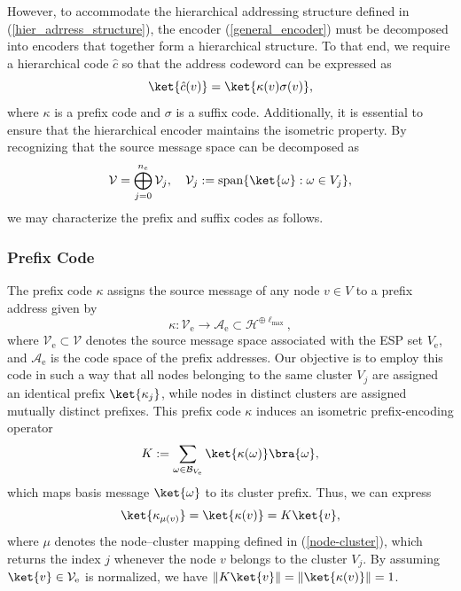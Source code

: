 \documentclass[conference]{IEEEtran}
\begin{document}
However, to accommodate the hierarchical addressing structure defined in (\ref{hier_adrress_structure}), the encoder (\ref{general_encoder}) must be decomposed into encoders that together form a hierarchical structure. To that end, we require a hierarchical code $\hat{c}$ so that the address codeword can be expressed as
\begin{equation}
    \ket{\hat{c}(v)} = \ket{\kappa(v) \sigma(v)},
\end{equation}
where $\kappa$ is a prefix code and $\sigma$ is a suffix code. Additionally, it is essential to ensure that the hierarchical encoder maintains the isometric property.
By recognizing that the source message space can be decomposed as 
\begin{equation}
    \mathcal{V} = \bigoplus_{j=0}^{n_e} \mathcal{V}_j, \quad \mathcal{V}_j := \mathrm{span}\{\ket{\omega} : \omega \in V_{j}\}, \label{SourceSpace_decomposition}
\end{equation}
we may characterize the prefix and suffix codes as follows.

\subsubsection{Prefix Code }
The prefix code $\kappa$ assigns the source message of any node $v\in V$ to a prefix address given by
\begin{equation}
    \kappa: \mathcal{V}_\mathrm{e} \longrightarrow \mathcal{A}_\mathrm{e} \subset \mathcal{H}^{\oplus \ell_\mathrm{max}},
\end{equation}
where $\mathcal{V}_\mathrm{e}\subset\mathcal{V}$ denotes the source message space associated with the ESP set $V_\mathrm{e}$, and $\mathcal{A}_\mathrm{e}$ is the code space of the prefix addresses. 
Our objective is to employ this code in such a way that all nodes belonging to the same cluster $V_j$ are assigned an identical prefix $\ket{\kappa_j}$, while nodes in distinct clusters are assigned mutually distinct prefixes. 
This prefix code $\kappa$ induces an isometric prefix-encoding operator
\begin{equation}
    {K}:= \sum_{\omega \in \mathcal{B}_{V_\mathrm{e}}} \ket{\kappa(\omega)}\bra{\omega}, \label{Prefix_Encoder_Operator}
\end{equation}
which maps basis message $\ket{\omega}$ to its cluster prefix. Thus, we can express
\begin{equation}
\ket{\kappa_{\mu(v)}}=\ket{\kappa(v)}={K}\ket{v},
\end{equation}
where $\mu$ denotes the node–cluster mapping defined in (\ref{node-cluster}), which returns the index $j$ whenever the node $v$ belongs to the cluster $V_j$. By assuming $\ket{v}\in\mathcal{V_\mathrm{e}}$ is normalized, we have $\Vert K\ket{v} \Vert = \Vert \ket{\kappa(v)}\Vert=1$.
\end{document}
